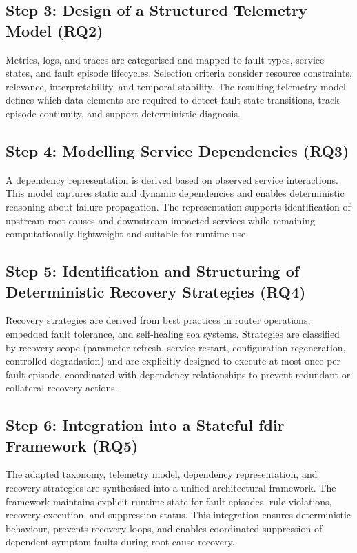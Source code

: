 \subsection*{Step 3: Design of a Structured Telemetry Model (RQ2)}

Metrics, logs, and traces are categorised and mapped to fault types, service states, and fault episode lifecycles. Selection criteria consider resource constraints, relevance, interpretability, and temporal stability. The resulting telemetry model defines which data elements are required to detect fault state transitions, track episode continuity, and support deterministic diagnosis.

\subsection*{Step 4: Modelling Service Dependencies (RQ3)}

A dependency representation is derived based on observed service interactions. This model captures static and dynamic dependencies and enables deterministic reasoning about failure propagation. The representation supports identification of upstream root causes and downstream impacted services while remaining computationally lightweight and suitable for runtime use.

\subsection*{Step 5: Identification and Structuring of Deterministic Recovery Strategies (RQ4)}

Recovery strategies are derived from best practices in router operations, embedded fault tolerance, and self-healing \gls{soa} systems. Strategies are classified by recovery scope (parameter refresh, service restart, configuration regeneration, controlled degradation) and are explicitly designed to execute at most once per fault episode, coordinated with dependency relationships to prevent redundant or collateral recovery actions.

\subsection*{Step 6: Integration into a Stateful \gls{fdir} Framework (RQ5)}

The adapted taxonomy, telemetry model, dependency representation, and recovery strategies are synthesised into a unified architectural framework. The framework maintains explicit runtime state for fault episodes, rule violations, recovery execution, and suppression status. This integration ensures deterministic behaviour, prevents recovery loops, and enables coordinated suppression of dependent symptom faults during root cause recovery.

